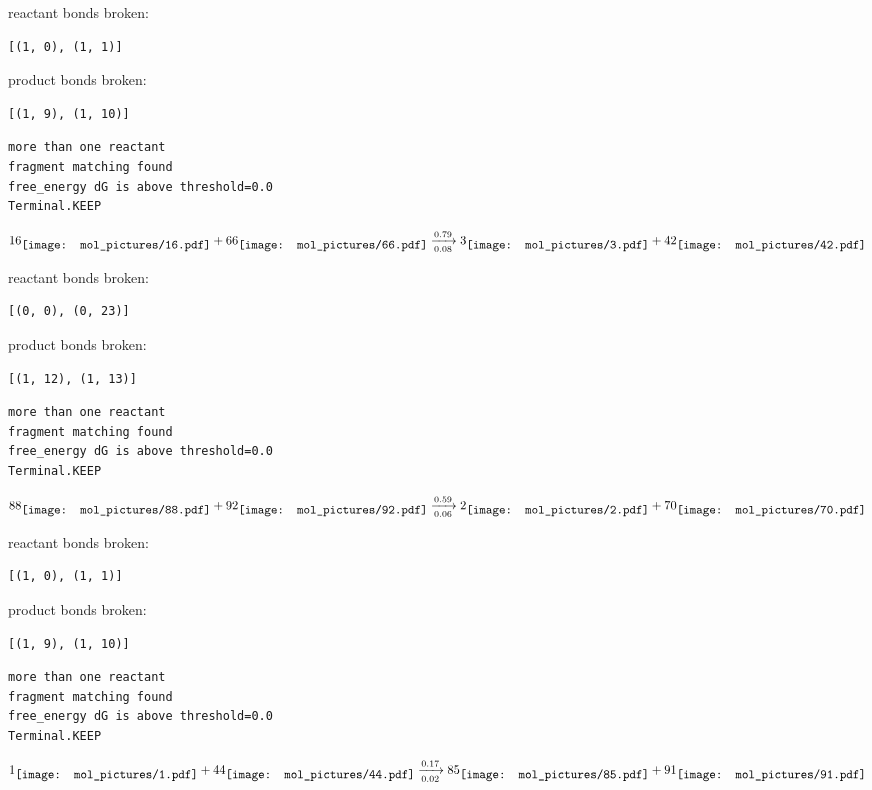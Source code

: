 \documentclass{article}
\begin{document}
reactant bonds broken:\begin{verbatim}
[(1, 0), (1, 1)]
\end{verbatim}
product bonds broken:\begin{verbatim}
[(1, 9), (1, 10)]
\end{verbatim}




\vspace{1cm}
\begin{verbatim}
more than one reactant
fragment matching found
free_energy dG is above threshold=0.0
Terminal.KEEP
\end{verbatim}
$$
16
\raisebox{-.5\height}{\texttt{[image: mol\_pictures/16.pdf]}}
+
66
\raisebox{-.5\height}{\texttt{[image: mol\_pictures/66.pdf]}}
\xrightarrow[0.08]{0.79}
3
\raisebox{-.5\height}{\texttt{[image: mol\_pictures/3.pdf]}}
+
42
\raisebox{-.5\height}{\texttt{[image: mol\_pictures/42.pdf]}}
$$


reactant bonds broken:\begin{verbatim}
[(0, 0), (0, 23)]
\end{verbatim}
product bonds broken:\begin{verbatim}
[(1, 12), (1, 13)]
\end{verbatim}




\vspace{1cm}
\begin{verbatim}
more than one reactant
fragment matching found
free_energy dG is above threshold=0.0
Terminal.KEEP
\end{verbatim}
$$
88
\raisebox{-.5\height}{\texttt{[image: mol\_pictures/88.pdf]}}
+
92
\raisebox{-.5\height}{\texttt{[image: mol\_pictures/92.pdf]}}
\xrightarrow[0.06]{0.59}
2
\raisebox{-.5\height}{\texttt{[image: mol\_pictures/2.pdf]}}
+
70
\raisebox{-.5\height}{\texttt{[image: mol\_pictures/70.pdf]}}
$$


reactant bonds broken:\begin{verbatim}
[(1, 0), (1, 1)]
\end{verbatim}
product bonds broken:\begin{verbatim}
[(1, 9), (1, 10)]
\end{verbatim}




\vspace{1cm}
\begin{verbatim}
more than one reactant
fragment matching found
free_energy dG is above threshold=0.0
Terminal.KEEP
\end{verbatim}
$$
1
\raisebox{-.5\height}{\texttt{[image: mol\_pictures/1.pdf]}}
+
44
\raisebox{-.5\height}{\texttt{[image: mol\_pictures/44.pdf]}}
\xrightarrow[0.02]{0.17}
85
\raisebox{-.5\height}{\texttt{[image: mol\_pictures/85.pdf]}}
+
91
\raisebox{-.5\height}{\texttt{[image: mol\_pictures/91.pdf]}}
$$
\end{document}

